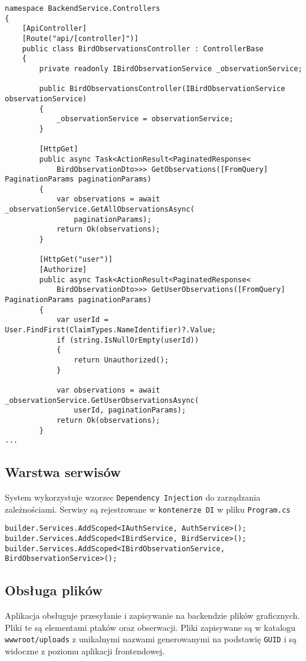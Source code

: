 \begin{lstlisting}[style=csharp, caption={Fragment implementacji BirdsObervationsController}]
namespace BackendService.Controllers
{
	[ApiController]
	[Route("api/[controller]")]
	public class BirdObservationsController : ControllerBase
	{
		private readonly IBirdObservationService _observationService;
		
		public BirdObservationsController(IBirdObservationService observationService)
		{
			_observationService = observationService;
		}
		
		[HttpGet]
		public async Task<ActionResult<PaginatedResponse<
			BirdObservationDto>>> GetObservations([FromQuery] PaginationParams paginationParams)
		{
			var observations = await _observationService.GetAllObservationsAsync(
				paginationParams);
			return Ok(observations);
		}
		
		[HttpGet("user")]
		[Authorize]
		public async Task<ActionResult<PaginatedResponse<
			BirdObservationDto>>> GetUserObservations([FromQuery] PaginationParams paginationParams)
		{
			var userId = User.FindFirst(ClaimTypes.NameIdentifier)?.Value;
			if (string.IsNullOrEmpty(userId))
			{
				return Unauthorized();
			}
			
			var observations = await _observationService.GetUserObservationsAsync(
				userId, paginationParams);
			return Ok(observations);
		}
...
\end{lstlisting}

\subsection{Warstwa serwisów}
System wykorzystuje wzorzec \texttt{Dependency Injection} do zarządzania zależnościami. Serwisy są rejestrowane w \texttt{kontenerze DI} w pliku \texttt{Program.cs}

\begin{lstlisting}[style=csharp, caption={Fragment Program.cs z rejestrowaniem serwisów}]
builder.Services.AddScoped<IAuthService, AuthService>();
builder.Services.AddScoped<IBirdService, BirdService>();
builder.Services.AddScoped<IBirdObservationService, BirdObservationService>();
\end{lstlisting}

\subsection{Obsługa plików}
Aplikacja obsługuje przesyłanie i zapisywanie na backendzie plików graficznych. Pliki te są elementami ptaków oraz obserwacji. Pliki zapisywane są w katalogu \texttt{wwwroot/uploads} z unikalnymi nazwami generowanymi na podstawię \texttt{GUID} i są widoczne z poziomu aplikacji frontendowej.

